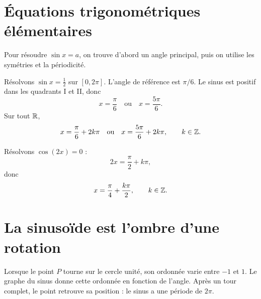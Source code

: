 \section{Équations trigonométriques élémentaires}
\label{manual:section:16.04}

Pour résoudre $\sin x=a$, on trouve d'abord un angle principal, puis on utilise les symétries et la périodicité.

\begin{examplebox}
Résolvons $\sin x=\frac12$ sur $[0,2\pi]$. L'angle de référence est $\pi/6$. Le sinus est positif dans les quadrants I et II, donc
\[
x=\frac\pi6
\quad\text{ou}\quad
x=\frac{5\pi}{6}.
\]
Sur tout $\mathbb{R}$,
\[
x=\frac\pi6+2k\pi
\quad\text{ou}\quad
x=\frac{5\pi}{6}+2k\pi,
\qquad k\in\mathbb{Z}.
\]
\end{examplebox}

\begin{examplebox}
Résolvons $\cos(2x)=0$ :
\[
2x=\frac\pi2+k\pi,
\]
donc
\[
x=\frac\pi4+\frac{k\pi}{2},
\qquad k\in\mathbb{Z}.
\]
\end{examplebox}


\section{La sinusoïde est l'ombre d'une rotation}
\label{manual:section:16.05}

\begin{visualbox}
Lorsque le point $P$ tourne sur le cercle unité, son ordonnée varie entre $-1$ et $1$. Le graphe du sinus donne cette ordonnée en fonction de l'angle. Après un tour complet, le point retrouve sa position : le sinus a une période de $2\pi$.
\end{visualbox}

\begin{center}
\end{center}

